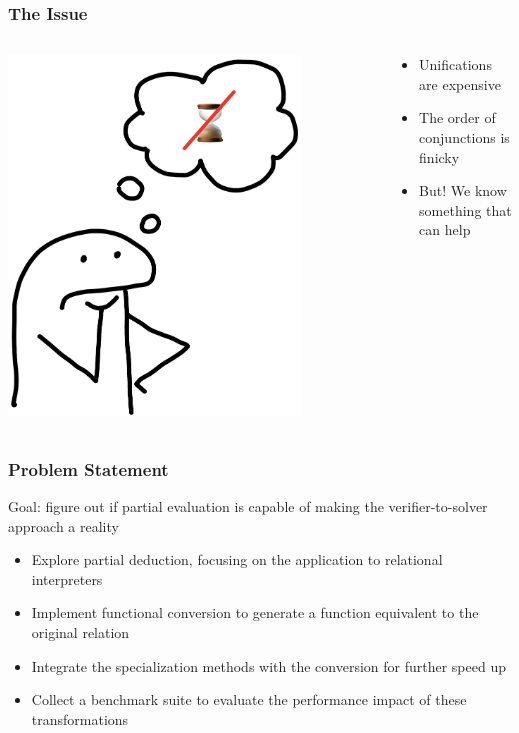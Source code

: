 \documentclass[xcolor={dvipsnames}, aspectratio=169]{beamer}
\begin{document}
\begin{frame}[fragile]
  \frametitle{The Issue}
  \begin{columns}    
    \begin{column}{0.35\textwidth}
      \centering
      \includegraphics[width=0.8\textwidth]{pic/slow.jpg}
    \end{column} \pause
    \begin{column}{0.75\textwidth} 
    \begin{itemize}
      \item Unifications are expensive
      \item The order of conjunctions is finicky
      \item But! We know something that can help
    \end{itemize}
    \end{column}
  \end{columns}

\end{frame}

\begin{frame}[fragile]
  \frametitle{Problem Statement}
  Goal: figure out if partial evaluation is capable of making the verifier-to-solver approach a reality

\vfill

  \begin{itemize}
    \item Explore partial deduction, focusing on the application to relational interpreters
    \item Implement functional conversion to generate a function equivalent to the original relation
    \item Integrate the specialization methods with the conversion for further speed up
    \item Collect a benchmark suite to evaluate the performance impact of these transformations
    
  \end{itemize}

\end{frame}
\end{document}
